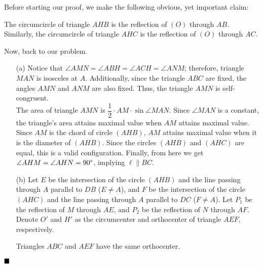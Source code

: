 \documentclass[11pt]{article}
\newenvironment{solution}[1][Solution]{%
  \proof[\normalfont \faPenNib \hspace{0.2cm} \ttfamily \scshape \large #1]%
}{\(\hfill \blacksquare\){\parfillskip0pt\par}}
\theoremstyle{definition}
\begin{document}
        \begin{solution}
            Before starting our proof, we make the following obvious, yet important claim:

            \begin{claim}
                The circumcircle of triangle \(AHB\) is the reflection of \((O)\) through \(AB\). Similarly, the circumcircle of triangle \(AHC\) is the reflection of \((O)\) through \(AC\).
            \end{claim}

            Now, back to our problem.

            \begin{enumerate}
                \item[(a)] Notice that \(\angle AMN = \angle ABH = \angle ACH = \angle ANM\); therefore, triangle \(MAN\) is isosceles at \(A\). Additionally, since the triangle \(ABC\) are fixed, the angles \(AMN\) and \(ANM\) are also fixed. Thus, the triangle \(AMN\) is self-congruent.\\
                The area of triangle \(AMN\) is \(\dfrac{1}{2} \cdot AM \cdot \sin \angle MAN\). Since \(\angle MAN\) is a constant, the triangle's area attains maximal value when \(AM\) attains maximal value. Since \(AM\) is the chord of circle \((AHB)\), \(AM\) attains maximal value when it is the diameter of \((AHB)\). Since the circles \((AHB)\) and \((AHC)\) are equal, this is a valid configuration. Finally, from here we get \(\angle AHM = \angle AHN = 90 \degree\), implying \(\ell \parallel BC\).

                \item[(b)] Let \(E\) be the intersection of the circle \((AHB)\) and the line passing through \(A\) parallel to \(DB\) (\(E \neq A\)), and \(F\) be the intersection of the circle \((AHC)\) and the line passing through \(A\) parallel to \(DC\) (\(F \neq A\)). Let \(P_1\) be the reflection of \(M\) through \(AE\), and \(P_2\) be the reflection of \(N\) through \(AF\). Denote \(O'\) and \(H'\) as the circumcenter and orthocenter of triangle \(AEF\), respectively.

                \begin{claim}
                    Triangles \(ABC\) and \(AEF\) have the same orthocenter.
                \end{claim}


\end{enumerate}
\end{solution}
\end{document}
